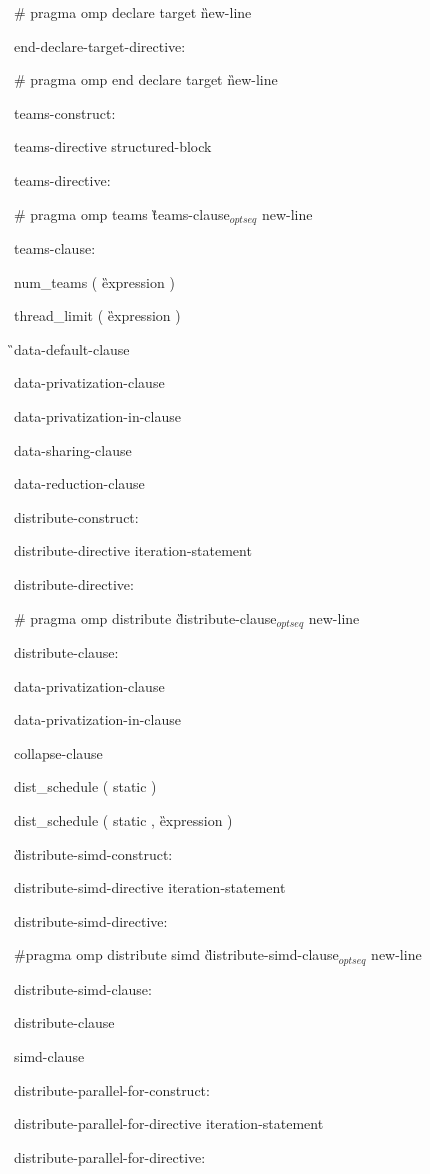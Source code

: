 {\C\I \# pragma omp declare target \G new-line

end-declare-target-directive:

\C\I \# pragma omp end declare target \G new-line

teams-construct:

\I teams-directive structured-block

teams-directive:

\C\I \# pragma omp teams \G teams-clause$_{optseq}$ new-line

teams-clause:

\C\I num\_teams ( \G expression \C )

\C\I thread\_limit ( \G expression \C )

\G\I data-default-clause

\I data-privatization-clause

\I data-privatization-in-clause

\I data-sharing-clause

\I data-reduction-clause

distribute-construct:

\I distribute-directive iteration-statement

distribute-directive:

\C\I \# pragma omp distribute \G distribute-clause$_{optseq}$ new-line

distribute-clause:

\I data-privatization-clause

\I data-privatization-in-clause

\I collapse-clause

\I dist\_schedule ( static )

\I dist\_schedule ( static , \G expression \C )

\G distribute-simd-construct:

\I distribute-simd-directive iteration-statement

distribute-simd-directive:

\C\I \#pragma omp distribute simd \G distribute-simd-clause$_{optseq}$ new-line

distribute-simd-clause:

\I distribute-clause

\I simd-clause

distribute-parallel-for-construct:

\I distribute-parallel-for-directive iteration-statement

distribute-parallel-for-directive:

}
